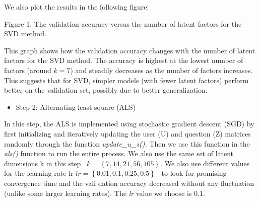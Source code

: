 \documentclass[letterpaper]{article}
\begin{document}
\bigskip

We also plot the results in the following figure:\newline



{\centering
Figure 1. The validation accuracy versus the number of latent factors for the SVD method.
\par}

This graph shows how the validation accuracy changes with the number of latent factors for the SVD method. The accuracy
is highest at the lowest number of factors (around  $k=7$) and steadily decreases as the number of factors increases.
This suggests that for SVD, simpler models (with fewer latent factors) perform better on the validation set, possibly
due to better generalization.


\bigskip

\begin{itemize}[resume*=listWWNumii]
\item Step 2: Alternating least square (ALS)
\end{itemize}

\bigskip

In this step, the ALS is implemented using stochastic gradient descent (SGD) by first initializing and iteratively
updating the user (U) and question (Z) matrices randomly through the function \textit{update\_u\_z().} Then we use this
function in the \textit{als()} function to run the entire process. We also use the same set of latent dimensions k in
this step \  $k=\left\{7,14,21,56,105\right\}$. We also use different values for the learning rate lr 
$\mathit{lr}=\left\{0.01,0.1,0.25,0.5\right\}$ \ to look for promising convergence time and the vali dation accuracy
decreased without any fluctuation (unlike some larger learning rates). The \textit{lr }value we choose is 0.1. 
\end{document}
